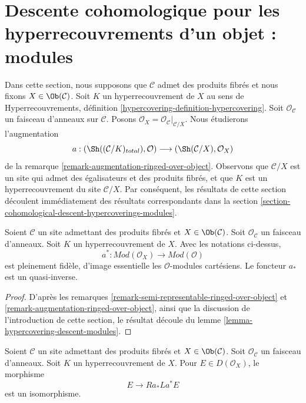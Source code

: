 \section{Descente cohomologique pour les hyperrecouvrements d'un objet : modules}
\label{section-cohomological-descent-hypercoverings-X-modules}

\noindent
Dans cette section, nous supposons que $\mathcal{C}$ admet des produits fibrés
et nous fixons $X \in \Ob(\mathcal{C})$. Soit $K$ un hyperrecouvrement de $X$
au sens de
Hyperrecouvrements, définition \ref{hypercovering-definition-hypercovering}.
Soit $\mathcal{O}_\mathcal{C}$ un faisceau d'anneaux sur $\mathcal{C}$.
Posons $\mathcal{O}_X = \mathcal{O}_\mathcal{C}|_{\mathcal{C}/X}$.
Nous étudierons l'augmentation
$$
a :
(\Sh((\mathcal{C}/K)_{total}), \mathcal{O})
\longrightarrow
(\Sh(\mathcal{C}/X), \mathcal{O}_X)
$$
de la remarque \ref{remark-augmentation-ringed-over-object}.
Observons que $\mathcal{C}/X$ est un site qui admet des égalisateurs
et des produits fibrés, et que $K$ est un hyperrecouvrement
du site $\mathcal{C}/X$.
Par conséquent, les résultats de cette section découlent immédiatement
des résultats correspondants dans la section
\ref{section-cohomological-descent-hypercoverings-modules}.

\begin{lemma}
\label{lemma-hypercovering-X-descent-modules}
Soient $\mathcal{C}$ un site admettant des produits fibrés et $X \in \Ob(\mathcal{C})$.
Soit $\mathcal{O}_\mathcal{C}$ un faisceau d'anneaux.
Soit $K$ un hyperrecouvrement de $X$. Avec les notations ci-dessus,
$$
a^* : \textit{Mod}(\mathcal{O}_X) \to \textit{Mod}(\mathcal{O})
$$
est pleinement fidèle, d'image essentielle les $\mathcal{O}$-modules cartésiens.
Le foncteur $a_*$ est un quasi-inverse.
\end{lemma}

\begin{proof}
D'après les remarques \ref{remark-semi-representable-ringed-over-object} et
\ref{remark-augmentation-ringed-over-object}, ainsi que la discussion de
l'introduction de cette section,
le résultat découle du lemme \ref{lemma-hypercovering-descent-modules}.
\end{proof}

\begin{lemma}
\label{lemma-hypercovering-X-descent-bounded-modules}
Soient $\mathcal{C}$ un site admettant des produits fibrés et $X \in \Ob(\mathcal{C})$.
Soit $\mathcal{O}_\mathcal{C}$ un faisceau d'anneaux.
Soit $K$ un hyperrecouvrement de $X$. Pour
$E \in D(\mathcal{O}_X)$, le morphisme
$$
E \longrightarrow Ra_*La^*E
$$
est un isomorphisme.
\end{lemma}

